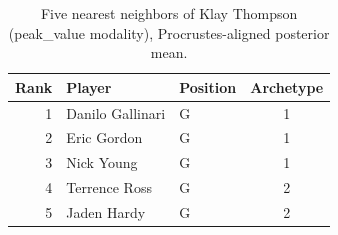 \begin{table}[htbp]
  \centering\small
  \begin{tabular}{rllc}
    \toprule
    Rank & Player & Position & Archetype \\
    \midrule
    1 & Danilo Gallinari & G & 1 \\
    2 & Eric Gordon & G & 1 \\
    3 & Nick Young & G & 1 \\
    4 & Terrence Ross & G & 2 \\
    5 & Jaden Hardy & G & 2 \\
    \bottomrule
  \end{tabular}
  \caption{Five nearest neighbors of Klay Thompson (peak_value modality), Procrustes-aligned posterior mean.}
  \label{tab:Klay_Thompson_neighbors_peak_value}
\end{table}

